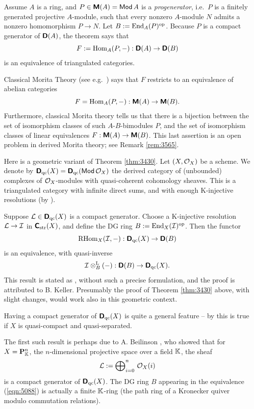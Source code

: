 \begin{exa}  \label{exa:3435}
Assume $A$ is a ring, and $P \in \boldsymbol{\mathsf{M}}(A) = \operatorname{\mathsf{Mod}} A$ is a 
{\em progenerator}, i.e.\ $P$ is a finitely generated projective $A$-module, 
such that every nonzero $A$-module $N$ admits a nonzero homomorphism 
$P \to N$. Let $B := \operatorname{End}_A(P)^{\mathrm{op}}$. 
Because $P$ is a compact generator of $\boldsymbol{\mathsf{D}}(A)$, the theorem 
says that 
\[ F := \operatorname{Hom}_A(P, -) : \boldsymbol{\mathsf{D}}(A) \to \boldsymbol{\mathsf{D}}(B) \]
is an equivalence of triangulated categories. 

Classical Morita Theory 
(see e.g.\ \cite[Section 4.1]{Row}) says that $F$ restricts to an equivalence 
of abelian categories 
\[ F = \operatorname{Hom}_A(P, -) : \boldsymbol{\mathsf{M}}(A) \to \boldsymbol{\mathsf{M}}(B) . \]
Furthermore, classical Morita theory tells us that there is a bijection between 
the set of isomorphism classes of such $A$-$B$-bimodules $P$, and the set of 
isomorphism classes of linear equivalences 
$F : \boldsymbol{\mathsf{M}}(A) \to \boldsymbol{\mathsf{M}}(B)$. 
This last assertion is an open problem in derived Morita theory; see Remark 
\ref{rem:3565}. 
\end{exa}

\begin{rem} \label{rem:3470}
Here is a geometric variant of Theorem \ref{thm:3430}. Let $(X, \mathcal{O}_X)$ be a 
scheme. We denote by 
$\boldsymbol{\mathsf{D}}_{\mathrm{qc}}(X) = \boldsymbol{\mathsf{D}}_{\mathrm{qc}}(\operatorname{\mathsf{Mod}} \mathcal{O}_X)$ 
the derived category of 
(unbounded) complexes of $\mathcal{O}_X$-modules with quasi-coherent cohomology 
sheaves. This is a triangulated category with infinite direct sums, and with 
enough K-injective resolutions (by \cite[Theorem 4.5]{Spa}). 

Suppose $\mathcal{L} \in \boldsymbol{\mathsf{D}}_{\mathrm{qc}}(X)$ is a compact generator. Choose a 
K-injective resolution $\mathcal{L} \to \mathcal{I}$ in 
$\boldsymbol{\mathsf{C}}_{\mathrm{str}}(X)$, and define the DG ring 
$B := \operatorname{End}_X(\mathcal{I})^{\mathrm{op}}$.
Then the functor 
\begin{equation} \label{eqn:5088}
\operatorname{RHom}_X(\mathcal{I}, -) : \boldsymbol{\mathsf{D}}_{\mathrm{qc}}(X) \to \boldsymbol{\mathsf{D}}(B)
\end{equation}
is an equivalence, with quasi-inverse 
\[ \mathcal{I} \otimes^{\mathrm{L}}_{B} (-) : \boldsymbol{\mathsf{D}}(B) \to \boldsymbol{\mathsf{D}}_{\mathrm{qc}}(X) . \]
This result is stated as \cite[Corollary 3.1.8]{BonVdB}, without such a precise 
formulation, and the proof is attributed to B. Keller. Presumably the proof of 
Theorem \ref{thm:3430} above, with slight changes, would work also in this 
geometric context. 

Having a compact generator of $\boldsymbol{\mathsf{D}}_{\mathrm{qc}}(X)$ is quite a general 
feature -- by \cite[Theorem 3.1.1]{BonVdB} this is true if $X$ is quasi-compact 
and quasi-separated. 

The first such result is perhaps due to A. Beilinson \cite{Bei}, who showed 
that for $X = \mathbf{P}^n_{\mathbb{K}}$, the $n$-dimensional projective space over a 
field $\mathbb{K}$, the sheaf 
\[ \mathcal{L} := \bigoplus\nolimits_{i = 0}^n \, \mathcal{O}_X(i) \]
is a compact generator of $\boldsymbol{\mathsf{D}}_{\mathrm{qc}}(X)$. The DG ring $B$ appearing 
in the equivalence (\ref{eqn:5088}) is actually a finite $\mathbb{K}$-ring (the path 
ring of a Kronecker quiver modulo commutation relations).  
\end{rem}

